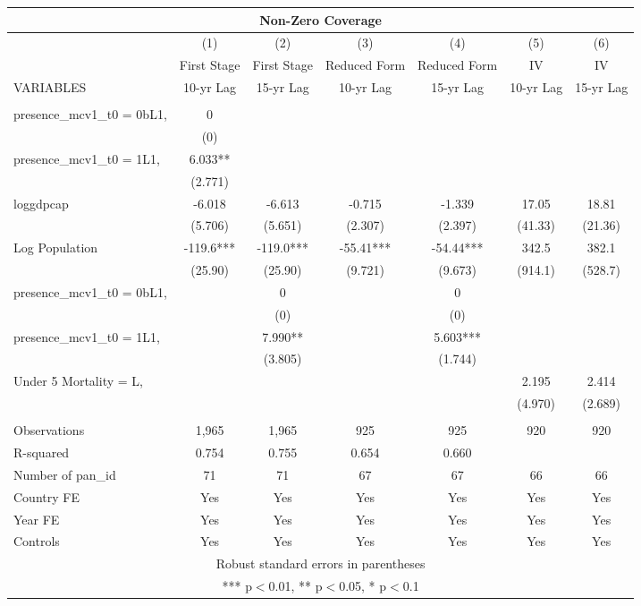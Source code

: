 \documentclass[]{article}
\begin{document}
\begin{tabular}{lcccccc}
\multicolumn{7}{c}{Non-Zero Coverage} \\ \hline
 & (1) & (2) & (3) & (4) & (5) & (6) \\
 & First Stage & First Stage & Reduced Form & Reduced Form & IV & IV \\
VARIABLES & 10-yr Lag & 15-yr Lag & 10-yr Lag & 15-yr Lag & 10-yr Lag & 15-yr Lag \\ \hline
 &  &  &  &  &  &  \\
presence\_mcv1\_t0 = 0bL1, & 0 &  &  &  &  &  \\
 & (0) &  &  &  &  &  \\
presence\_mcv1\_t0 = 1L1, & 6.033** &  &  &  &  &  \\
 & (2.771) &  &  &  &  &  \\
loggdpcap & -6.018 & -6.613 & -0.715 & -1.339 & 17.05 & 18.81 \\
 & (5.706) & (5.651) & (2.307) & (2.397) & (41.33) & (21.36) \\
Log Population & -119.6*** & -119.0*** & -55.41*** & -54.44*** & 342.5 & 382.1 \\
 & (25.90) & (25.90) & (9.721) & (9.673) & (914.1) & (528.7) \\
presence\_mcv1\_t0 = 0bL1, &  & 0 &  & 0 &  &  \\
 &  & (0) &  & (0) &  &  \\
presence\_mcv1\_t0 = 1L1, &  & 7.990** &  & 5.603*** &  &  \\
 &  & (3.805) &  & (1.744) &  &  \\
Under 5 Mortality = L, &  &  &  &  & 2.195 & 2.414 \\
 &  &  &  &  & (4.970) & (2.689) \\
 &  &  &  &  &  &  \\
Observations & 1,965 & 1,965 & 925 & 925 & 920 & 920 \\
R-squared & 0.754 & 0.755 & 0.654 & 0.660 &  &  \\
Number of pan\_id & 71 & 71 & 67 & 67 & 66 & 66 \\
Country FE & Yes & Yes & Yes & Yes & Yes & Yes \\
Year FE & Yes & Yes & Yes & Yes & Yes & Yes \\
 Controls & Yes & Yes & Yes & Yes & Yes & Yes \\ \hline
\multicolumn{7}{c}{ Robust standard errors in parentheses} \\
\multicolumn{7}{c}{ *** p$<$0.01, ** p$<$0.05, * p$<$0.1} \\
\end{tabular}
\end{document}
